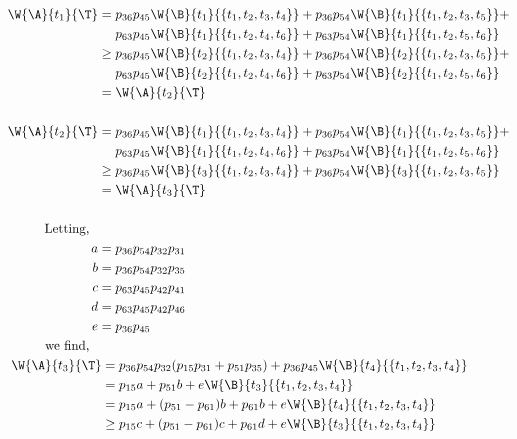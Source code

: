 {{        {\allowdisplaybreaks
        \begin{align*}
            \W{\A}{t_1}{\T} = \;&p_{36}p_{45}\W{\B}{t_1}{\{t_1, t_2, t_3, t_4\}} + p_{36}p_{54}\W{\B}{t_1}{\{t_1, t_2, t_3, t_5\}} + \\
            &p_{63}p_{45}\W{\B}{t_1}{\{t_1, t_2, t_4, t_6\}} +p_{63}p_{54}\W{\B}{t_1}{\{t_1, t_2, t_5, t_6\}}\\
            \geq \;&p_{36}p_{45}\W{\B}{t_2}{\{t_1, t_2, t_3, t_4\}} + p_{36}p_{54}\W{\B}{t_2}{\{t_1, t_2, t_3, t_5\}} + \\
            &p_{63}p_{45}\W{\B}{t_2}{\{t_1, t_2, t_4, t_6\}} +p_{63}p_{54}\W{\B}{t_2}{\{t_1, t_2, t_5, t_6\}}\\
            = \;& \W{\A}{t_2}{\T}\\
            \\
            \W{\A}{t_2}{\T} = \;&p_{36}p_{45}\W{\B}{t_1}{\{t_1, t_2, t_3, t_4\}} + p_{36}p_{54}\W{\B}{t_1}{\{t_1, t_2, t_3, t_5\}} + \\
            &p_{63}p_{45}\W{\B}{t_1}{\{t_1, t_2, t_4, t_6\}} +p_{63}p_{54}\W{\B}{t_1}{\{t_1, t_2, t_5, t_6\}}\\
            \geq \;&p_{36}p_{45}\W{\B}{t_3}{\{t_1, t_2, t_3, t_4\}} + p_{36}p_{54}\W{\B}{t_3}{\{t_1, t_2, t_3, t_5\}}\\
            = \;& \W{\A}{t_3}{\T}\\
            \\
            \textrm{Letting,\quad\quad}\\
            a = \;&p_{36}p_{54}p_{32}p_{31}\\
            b = \;&p_{36}p_{54}p_{32}p_{35}\\
            c = \;&p_{63}p_{45}p_{42}p_{41}\\
            d = \;&p_{63}p_{45}p_{42}p_{46}\\
            e = \;&p_{36}p_{45}\\
            \textrm{we find,\quad\quad}\\
            \W{\A}{t_3}{\T} =&\; p_{36}p_{54}p_{32}(p_{15}p_{31} + p_{51}p_{35}) + p_{36}p_{45}\W{\B}{t_4}{\{t_1, t_2, t_3, t_4\}}\\
            =&\;p_{15}a + p_{51}b + e\W{\B}{t_3}{\{t_1, t_2, t_3, t_4\}}\\
            =&\;p_{15}a + (p_{51}-p_{61})b + p_{61}b + e\W{\B}{t_4}{\{t_1, t_2, t_3, t_4\}}\\
            \geq&\; p_{15}c + (p_{51}-p_{61})c + p_{61}d + e\W{\B}{t_3}{\{t_1, t_2, t_3, t_4\}}\\

\end{align*}}}}
